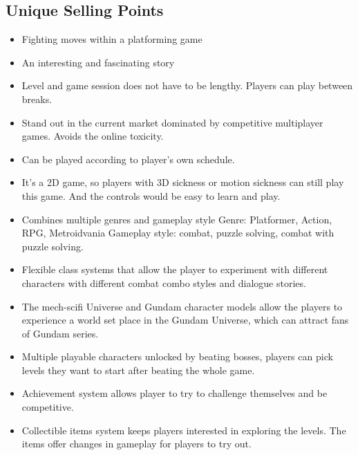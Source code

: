 \documentclass{article}
\begin{document}
\subsection*{Unique Selling Points}
    \begin{itemize}
        \item Fighting moves within a platforming game
        \item An interesting and fascinating story 
        \item Level and game session does not have to be lengthy. Players can play between breaks.
        \item Stand out in the current market dominated by competitive multiplayer games. Avoids the online toxicity.
        \item Can be played according to player’s own schedule. 
        \item It’s a 2D game, so players with 3D sickness or motion sickness can still play this game. And the controls would be easy to learn and play.
        \item Combines multiple genres and gameplay style
        \subitem Genre: Platformer, Action, RPG, Metroidvania 
        \subitem Gameplay style: combat, puzzle solving, combat with puzzle solving.
        \item Flexible class systems that allow the player to experiment with different characters with different combat combo styles and dialogue stories.
        \item The mech-scifi Universe and Gundam character models allow the players to experience a world set place in the Gundam Universe, which can attract fans of Gundam series.
        \item Multiple playable characters unlocked by beating bosses, players can pick levels they want to start after beating the whole game.
        \item Achievement system  allows player to try to challenge themselves and be competitive. 
        \item Collectible items system keeps players interested in exploring the levels. The items offer changes in gameplay for players to try out. 
    \end{itemize}
\end{document}

